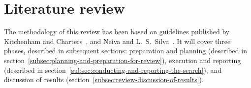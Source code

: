 \section{Literature review}\label{sec:literature-review}

The methodology of this review has been based on guidelines published by Kitchenham and Charters~\cite{kitchenham_guidelines_2007}, and Neiva and L.~S.~Silva~\cite{neiva_systematic_2016}.
It will cover three phases, described in subsequent sections: preparation and planning (described in section~\ref{subsec:planning-and-preparation-for-review}), execution and reporting (described in section~\ref{subsec:conducting-and-reporting-the-search}), and discussion of results (section~\ref{subsec:review-discussion-of-results}).






